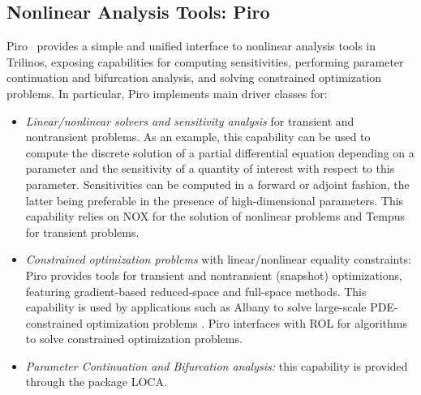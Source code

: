 \subsection{Nonlinear Analysis Tools: Piro}
Piro~\cite{osti_1231283} provides a simple and unified interface to nonlinear analysis tools in Trilinos, exposing capabilities for computing sensitivities, performing parameter continuation and bifurcation analysis, and solving constrained optimization problems.
In particular, Piro implements main driver classes for:
\begin{itemize}
	\item \emph{Linear/nonlinear solvers and sensitivity analysis} for transient and nontransient problems. As an example, this capability can be used to compute the discrete solution of a partial differential equation depending on a parameter and the sensitivity of a quantity of interest with respect to this parameter. Sensitivities can be computed in a forward or adjoint fashion, the latter being preferable in the presence of high-dimensional parameters. This capability relies on NOX for the solution of nonlinear problems and Tempus for transient problems.
	\item \emph{Constrained optimization problems} with linear/nonlinear equality constraints: Piro provides tools for transient and nontransient (snapshot) optimizations, featuring gradient-based reduced-space and full-space methods. This capability is used by applications such as Albany to solve large-scale PDE-constrained optimization problems \cite{Perego2022}. Piro interfaces with ROL for algorithms to solve constrained optimization problems.
\item \emph{Parameter Continuation and Bifurcation analysis:} this capability is provided through the package LOCA.
\end{itemize}
